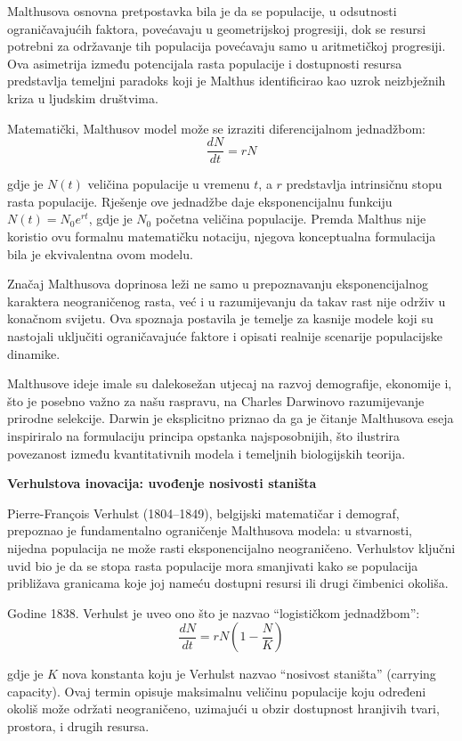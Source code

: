 \documentclass[11pt,oneside]{book}
\begin{document}
Malthusova osnovna pretpostavka bila je da se populacije, u odsutnosti ograničavajućih faktora, povećavaju u geometrijskoj progresiji, dok se resursi potrebni za održavanje tih populacija povećavaju samo u aritmetičkoj progresiji. Ova asimetrija između potencijala rasta populacije i dostupnosti resursa predstavlja temeljni paradoks koji je Malthus identificirao kao uzrok neizbježnih kriza u ljudskim društvima.

Matematički, Malthusov model može se izraziti diferencijalnom jednadžbom:
$$\frac{dN}{dt} = rN$$

gdje je $N(t)$ veličina populacije u vremenu $t$, a $r$ predstavlja intrinsičnu stopu rasta populacije. Rješenje ove jednadžbe daje eksponencijalnu funkciju $N(t) = N_0 e^{rt}$, gdje je $N_0$ početna veličina populacije. Premda Malthus nije koristio ovu formalnu matematičku notaciju, njegova konceptualna formulacija bila je ekvivalentna ovom modelu.

Značaj Malthusova doprinosa leži ne samo u prepoznavanju eksponencijalnog karaktera neograničenog rasta, već i u razumijevanju da takav rast nije održiv u konačnom svijetu. Ova spoznaja postavila je temelje za kasnije modele koji su nastojali uključiti ograničavajuće faktore i opisati realnije scenarije populacijske dinamike.

Malthusove ideje imale su dalekosežan utjecaj na razvoj demografije, ekonomije i, što je posebno važno za našu raspravu, na Charles Darwinovo razumijevanje prirodne selekcije. Darwin je eksplicitno priznao da ga je čitanje Malthusova eseja inspiriralo na formulaciju principa opstanka najsposobnijih, što ilustrira povezanost između kvantitativnih modela i temeljnih biologijskih teorija.

\textbf{Verhulstova inovacija: uvođenje nosivosti staništa}

Pierre-François Verhulst (1804--1849), belgijski matematičar i demograf, prepoznao je fundamentalno ograničenje Malthusova modela: u stvarnosti, nijedna populacija ne može rasti eksponencijalno neograničeno. Verhulstov ključni uvid bio je da se stopa rasta populacije mora smanjivati kako se populacija približava granicama koje joj nameću dostupni resursi ili drugi čimbenici okoliša.

Godine 1838. Verhulst je uveo ono što je nazvao ``logističkom jednadžbom'':
$$\frac{dN}{dt} = rN\left(1 - \frac{N}{K}\right)$$

gdje je $K$ nova konstanta koju je Verhulst nazvao ``nosivost staništa'' (carrying capacity). Ovaj termin opisuje maksimalnu veličinu populacije koju određeni okoliš može održati neograničeno, uzimajući u obzir dostupnost hranjivih tvari, prostora, i drugih resursa.
\end{document}
